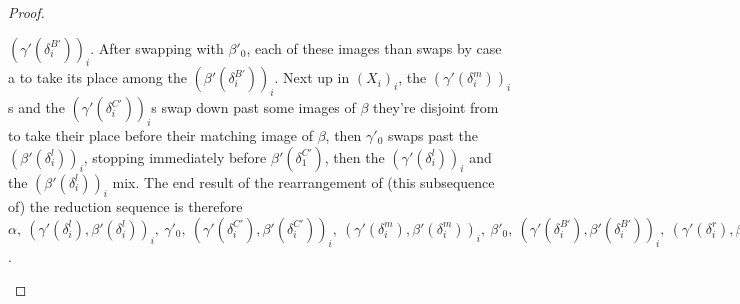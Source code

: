 \documentclass{article}
\theoremstyle{definition}
\theoremstyle{lemma}
\theoremstyle{remark}
\begin{document}
\begin{proof}
\begin{itemize}
$(\gamma'(\delta^{B'}_i))_i$. After swapping with $\beta'_0$, each of these images than swaps by case a to take its place among the $(\beta'(\delta^{B'}_i))_i$. Next up in $(X_i)_i$, the $(\gamma'(\delta^m_i))_i$s and the $(\gamma'(\delta^{C'}_i))_i$s swap down past some images of $\beta$ they're disjoint from to take their place before their matching image of $\beta$, then $\gamma'_0$ swaps past the $(\beta'(\delta^l_i))_i$, stopping immediately before $\beta'(\delta^{C'}_1)$, then the $(\gamma'(\delta^l_i))_i$ and the $(\beta'(\delta^l_i))_i$ mix. The end result of the rearrangement of (this subsequence of) the reduction sequence is therefore $\alpha,\ (\gamma'(\delta^l_i), \beta'(\delta^l_i))_i,\ \gamma'_0,\ (\gamma'(\delta^{C'}_i), \beta'(\delta^{C'}_i))_i,\ (\gamma'(\delta^m_i), \beta'(\delta^m_i))_i,\ \beta'_0,\ (\gamma'(\delta^{B'}_i), \beta'(\delta^{B'}_i))_i,\ (\gamma'(\delta^r_i), \beta'(\delta^r_i))_i$.


\end{itemize}
\end{proof}
\end{document}
